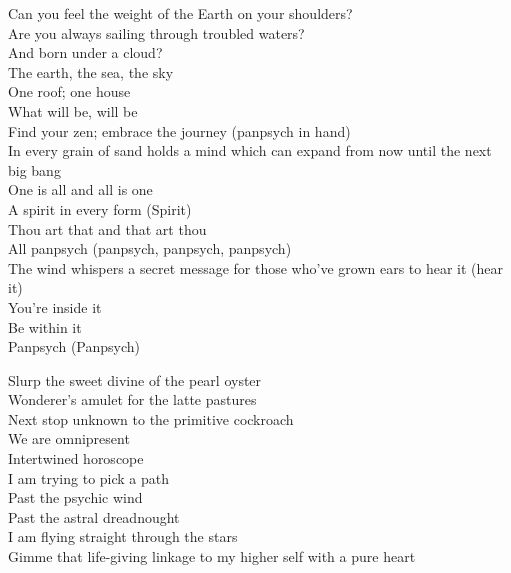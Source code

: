 


Can you feel the weight of the Earth on your shoulders? \\
Are you always sailing through troubled waters? \\
And born under a cloud? \\
The earth, the sea, the sky \\
One roof; one house \\

What will be, will be \\
Find your zen; embrace the journey (panpsych in hand) \\
In every grain of sand holds a mind which can expand from now until the next big bang \\

One is all and all is one \\
A spirit in every form (Spirit) \\
Thou art that and that art thou \\
All panpsych (panpsych, panpsych, panpsych) \\
The wind whispers a secret message for those who've grown ears to hear it (hear it) \\
You're inside it \\
Be within it \\
Panpsych (Panpsych) \\


Slurp the sweet divine of the pearl oyster \\
Wonderer's amulet for the latte pastures \\
Next stop unknown to the primitive cockroach \\
We are omnipresent \\
Intertwined horoscope \\

I am trying to pick a path \\
Past the psychic wind \\
Past the astral dreadnought \\
I am flying straight through the stars \\
Gimme that life-giving linkage to my higher self with a pure heart \\


